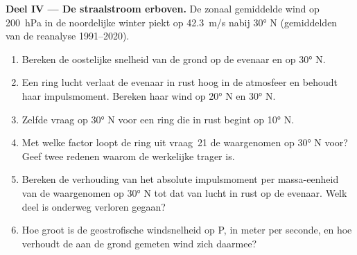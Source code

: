 \begin{problem}
\medskip
\noindent\textbf{Deel IV --- De straalstroom erboven.} De zonaal gemiddelde wind op \qty{200}{hPa} in
de noordelijke winter piekt op \qty{42.3}{m/s} nabij \ang{30} N (gemiddelden van de reanalyse
1991--2020).
\begin{enumerate}[resume]
  \item Bereken de oostelijke snelheid van de grond op de evenaar en op \ang{30} N.
  \item Een ring lucht verlaat de evenaar in rust hoog in de atmosfeer en behoudt haar impulsmoment. Bereken haar wind op \ang{20} N en \ang{30} N.
  \item Zelfde vraag op \ang{30} N voor een ring die in rust begint op \ang{10} N.
  \item Met welke factor loopt de ring uit vraag~21 de waargenomen  op \ang{30} N voor? Geef twee redenen waarom de werkelijke  trager is.
  \item Bereken de verhouding van het absolute impulsmoment per massa-eenheid van de waargenomen  op \ang{30} N tot dat van lucht in rust op de evenaar. Welk deel is onderweg verloren gegaan?
  \item Hoe groot is de geostrofische windsnelheid op P, in meter per seconde, en hoe verhoudt de aan de grond gemeten wind zich daarmee?
\end{enumerate}
\end{problem}
